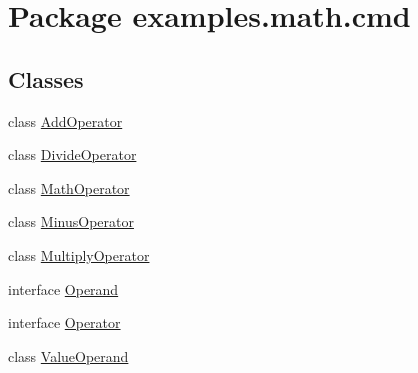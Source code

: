 \hypertarget{namespaceexamples_1_1math_1_1cmd}{\section{Package examples.\-math.\-cmd}
\label{namespaceexamples_1_1math_1_1cmd}
}
\subsection*{Classes}
\begin{DoxyCompactItemize}
\item 
class \hyperlink{classexamples_1_1math_1_1cmd_1_1_add_operator}{Add\-Operator}
\item 
class \hyperlink{classexamples_1_1math_1_1cmd_1_1_divide_operator}{Divide\-Operator}
\item 
class \hyperlink{classexamples_1_1math_1_1cmd_1_1_math_operator}{Math\-Operator}
\item 
class \hyperlink{classexamples_1_1math_1_1cmd_1_1_minus_operator}{Minus\-Operator}
\item 
class \hyperlink{classexamples_1_1math_1_1cmd_1_1_multiply_operator}{Multiply\-Operator}
\item 
interface \hyperlink{interfaceexamples_1_1math_1_1cmd_1_1_operand}{Operand}
\item 
interface \hyperlink{interfaceexamples_1_1math_1_1cmd_1_1_operator}{Operator}
\item 
class \hyperlink{classexamples_1_1math_1_1cmd_1_1_value_operand}{Value\-Operand}
\end{DoxyCompactItemize}
